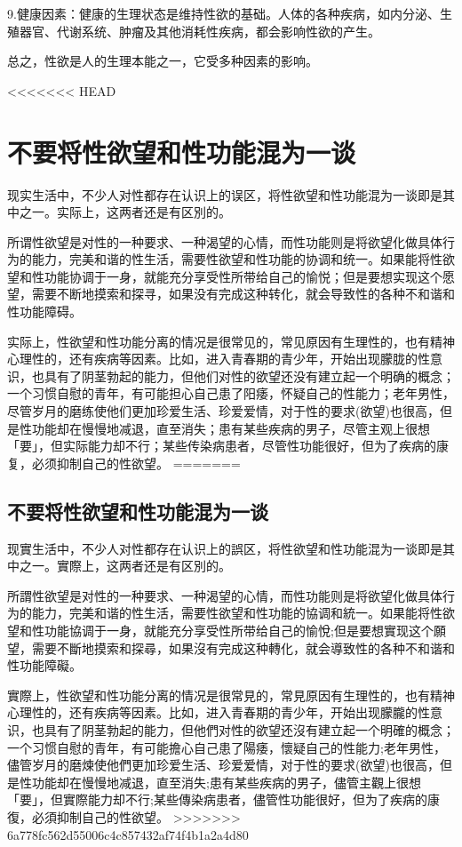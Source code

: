 \documentclass[12pt,UTF8]{ctexbook}
\begin{document}
9.健康因素：健康的生理状态是维持性欲的基础。人体的各种疾病，如内分泌、生殖器官、代谢系统、肿瘤及其他消耗性疾病，都会影响性欲的产生。

总之，性欲是人的生理本能之一，它受多种因素的影响。

<<<<<<< HEAD
\chapter{不要将性欲望和性功能混为一谈}

现实生活中，不少人对性都存在认识上的误区，将性欲望和性功能混为一谈即是其中之一。实际上，这两者还是有区別的。

所谓性欲望是对性的一种要求、一种渴望的心情，而性功能则是将欲望化做具体行为的能力，完美和谐的性生活，需要性欲望和性功能的协调和统一。如果能将性欲望和性功能协调于一身，就能充分享受性所带给自己的愉悦；但是要想实现这个愿望，需要不断地摸索和探寻，如果没有完成这种转化，就会导致性的各种不和谐和性功能障碍。

实际上，性欲望和性功能分离的情况是很常见的，常见原因有生理性的，也有精神心理性的，还有疾病等因素。比如，进入青春期的青少年，开始出现朦胧的性意识，也具有了阴茎勃起的能力，但他们对性的欲望还没有建立起一个明确的概念；一个习惯自慰的青年，有可能担心自己患了阳痿，怀疑自己的性能力；老年男性，尽管岁月的磨练使他们更加珍爱生活、珍爱爱情，对于性的要求(欲望)也很高，但是性功能却在慢慢地减退，直至消失；患有某些疾病的男子，尽管主观上很想「要」，但实际能力却不行；某些传染病患者，尽管性功能很好，但为了疾病的康复，必须抑制自己的性欲望。
=======
\section{不要将性欲望和性功能混为一谈}

现實生活中，不少人对性都存在认识上的誤区，将性欲望和性功能混为一谈即是其中之一。實際上，这两者还是有区別的。

所謂性欲望是对性的一种要求、一种渴望的心情，而性功能则是将欲望化做具体行为的能力，完美和谐的性生活，需要性欲望和性功能的協调和統一。如果能将性欲望和性功能協调于一身，就能充分享受性所带给自己的愉悅;但是要想實现这个願望，需要不斷地摸索和探尋，如果沒有完成这种轉化，就会導致性的各种不和谐和性功能障礙。

實際上，性欲望和性功能分离的情况是很常見的，常見原因有生理性的，也有精神心理性的，还有疾病等因素。比如，进入青春期的青少年，开始出现朦朧的性意识，也具有了阴茎勃起的能力，但他們对性的欲望还沒有建立起一个明確的概念；一个习惯自慰的青年，有可能擔心自己患了陽痿，懷疑自己的性能力;老年男性，儘管岁月的磨煉使他們更加珍爱生活、珍爱爱情，对于性的要求(欲望)也很高，但是性功能却在慢慢地减退，直至消失;患有某些疾病的男子，儘管主觀上很想「要」，但實際能力却不行;某些傳染病患者，儘管性功能很好，但为了疾病的康復，必須抑制自己的性欲望。
>>>>>>> 6a778fc562d55006c4c857432af74f4b1a2a4d80
\end{document}
